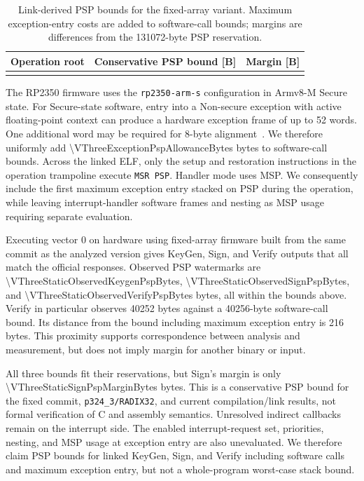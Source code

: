 \documentclass[a4paper,10pt]{article}
\theoremstyle{definition}
\theoremstyle{remark}
\begin{document}
\begin{table}[H]
  \centering
  \caption{Link-derived PSP bounds for the fixed-array variant. Maximum exception-entry costs are added to software-call bounds; margins are differences from the \num{131072}-byte PSP reservation.}
  \label{tab:v3-static-psp-bound}
  \small
  \begin{tabular}{@{}lrr@{}}
    \toprule
    Operation root & Conservative PSP bound [B] & Margin [B] \\
    \midrule
    \\
    \bottomrule
  \end{tabular}
\end{table}

The RP2350 firmware uses the \texttt{rp2350-arm-s} configuration in Armv8-M Secure state. For Secure-state software, entry into a Non-secure exception with active floating-point context can produce a hardware exception frame of up to 52 words. One additional word may be required for 8-byte alignment~\cite{arm-stack-sizing-2016}. We therefore uniformly add \num{\VThreeExceptionPspAllowanceBytes} bytes to software-call bounds. Across the linked ELF, only the setup and restoration instructions in the operation trampoline execute \texttt{MSR PSP}. Handler mode uses MSP. We consequently include the first maximum exception entry stacked on PSP during the operation, while leaving interrupt-handler software frames and nesting as MSP usage requiring separate evaluation.

Executing vector 0 on hardware using fixed-array firmware built from the same commit as the analyzed version gives KeyGen, Sign, and Verify outputs that all match the official responses. Observed PSP watermarks are \num{\VThreeStaticObservedKeygenPspBytes}, \num{\VThreeStaticObservedSignPspBytes}, and \num{\VThreeStaticObservedVerifyPspBytes} bytes, all within the bounds above. Verify in particular observes \num{40252} bytes against a \num{40256}-byte software-call bound. Its distance from the bound including maximum exception entry is \num{216} bytes. This proximity supports correspondence between analysis and measurement, but does not imply margin for another binary or input.

All three bounds fit their reservations, but Sign's margin is only \num{\VThreeStaticSignPspMarginBytes} bytes. This is a conservative PSP bound for the fixed commit, \texttt{p324\_3/RADIX32}, and current compilation/link results, not formal verification of C and assembly semantics. Unresolved indirect callbacks remain on the interrupt side. The enabled interrupt-request set, priorities, nesting, and MSP usage at exception entry are also unevaluated. We therefore claim PSP bounds for linked KeyGen, Sign, and Verify including software calls and maximum exception entry, but not a whole-program worst-case stack bound.
\end{document}
